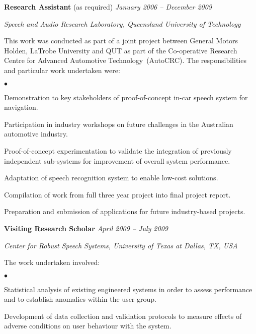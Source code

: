 \documentclass[margin,line]{resume}
\newenvironment{list1}{
  \begin{list}{}{%
      \setlength{\itemsep}{0in}
      \setlength{\parsep}{0in} \setlength{\parskip}{0in}
      \setlength{\topsep}{0in} \setlength{\partopsep}{0in}
      \setlength{\leftmargin}{0.17in}}}{\end{list}}
\newenvironment{list2}{
  \begin{list}{$\bullet$}{%
      \setlength{\itemsep}{0in}
      \setlength{\parsep}{0in} \setlength{\parskip}{0in}
      \setlength{\topsep}{0in} \setlength{\partopsep}{0in}
      \setlength{\leftmargin}{0.2in}}}{\end{list}}
\begin{document}
\begin{resume}
{\textbf{Research Assistant} (as required)} \hfill {\it January 2006 -- December 2009}\\
\vspace{-0.85\baselineskip}
\begin{list1}
\item {\it Speech and Audio Research Laboratory, Queensland University of Technology}
\item This work was conducted as part of a joint project between
    General Motors Holden, LaTrobe University and QUT as part of
    the Co-operative Research Centre for Advanced Automotive
    Technology~(AutoCRC). The responsibilities and particular work
    undertaken were:
\begin{list2}
\item Demonstration to key stakeholders of proof-of-concept in-car speech system for
    navigation.
\item Participation in industry workshops on future challenges in the Australian automotive industry.
\item Proof-of-concept experimentation to validate the integration of previously independent sub-systems for improvement of overall system performance.
\item Adaptation of speech recognition system to enable low-cost solutions.%
\item Compilation of work from full three year project into final project report.
\item Preparation and submission of applications for future industry-based projects.
\end{list2}
\end{list1}

{\bf Visiting Research Scholar} \hfill {\it April 2009 -- July 2009}\\
\vspace{-0.85\baselineskip}
\begin{list1}
\item {\it Center for Robust Speech Systems, University of Texas at Dallas, TX, USA}
\item The work undertaken involved:
\begin{list2}
\item Statistical analysis of existing engineered systems in order to assess performance and to establish anomalies within the user group.
\item Development of data collection and validation protocols to measure effects of adverse conditions on user behaviour with the system.
\end{list2}
\end{list1}


\end{resume}
\end{document}
